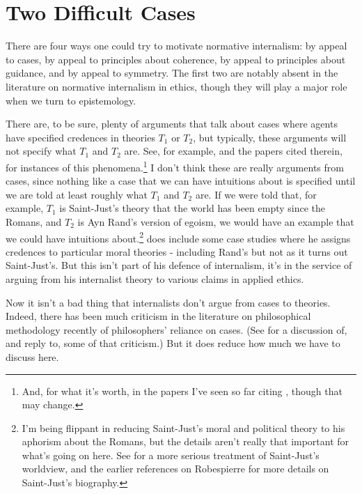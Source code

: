 \section{Two Difficult Cases}
\label{twodifficultcases}

There are four ways one could try to motivate normative internalism: by appeal to cases, by appeal to principles about coherence, by appeal to principles about guidance, and by appeal to symmetry. The first two are notably absent in the literature on normative internalism in ethics, though they will play a major role when we turn to epistemology.

There are, to be sure, plenty of arguments that talk about cases where agents have specified credences in theories $T_1$ or $T_2$, but typically, these arguments will not specify what $T_1$ and $T_2$ are. See, for example, \citet{GustafssonTorpman2014} and the papers cited therein, for instances of this phenomena.\footnote{And, for what it's worth, in the papers I've seen so far citing \citet{GustafssonTorpman2014}, though that may change.} I don't think these are really arguments from cases, since nothing like a case that we can have intuitions about is specified until we are told at least roughly what $T_1$ and $T_2$ are. If we were told that, for example, $T_1$ is \gls{Saint-Just}'s theory that the world has been empty since the Romans, and $T_2$ is Ayn Rand's version of egoism, we would have an example that we could have intuitions about.\footnote{I'm being flippant in reducing \gls{Saint-Just}'s moral and political theory to his aphorism about the Romans, but the details aren't really that important for what's going on here. See \citet{Williams1995} for a more serious treatment of \gls{Saint-Just}'s worldview, and the earlier references on \gls{Robespierre} for more details on \gls{Saint-Just}'s biography.} \citet{Lockhart2000} does include some case studies where he assigns credences to particular moral theories - including Rand's but not as it turns out \gls{Saint-Just}'s. But this isn't part of his defence of internalism, it's in the service of arguing from his internalist theory to various claims in applied ethics.

Now it isn't a bad thing that internalists don't argue from cases to theories. Indeed, there has been much criticism in the literature on philosophical methodology recently of philosophers' reliance on cases. (See \citet{Nagel2013} for a discussion of, and reply to, some of that criticism.) But it does reduce how much we have to discuss here.

